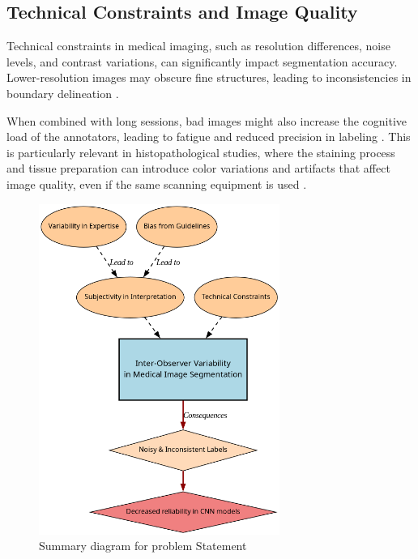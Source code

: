 \subsection{Technical Constraints and Image
Quality}\label{subsec:technical_constraints}

Technical constraints in medical imaging, such as resolution
differences, noise levels, and contrast variations, can significantly
impact segmentation accuracy. Lower-resolution images may obscure
fine structures, leading to inconsistencies in boundary delineation
\cite{ZhouEtAl2024}.

When combined with long sessions, bad images might
also increase the cognitive load of the annotators, leading to
fatigue and reduced precision in labeling \cite{KimYujinAndLee2024}.
This is particularly relevant in histopathological studies, where the
staining process and tissue preparation can introduce color
variations and artifacts that affect image quality, even if the same scanning
equipment is used \cite{Karthikeyan2023}.

\begin{figure}
  \centering
  \includegraphics[width=0.7\textwidth]{Cap1/Figures/problem_statement_diagram.png}
  \caption{Summary diagram for problem Statement}
  \label{fig:problem_statement_diagram}
\end{figure}

